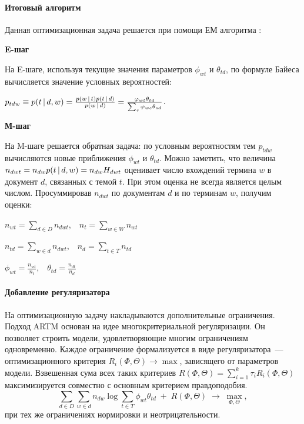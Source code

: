 \documentclass[12pt, twoside]{article}
\begin{document}
\paragraph{Итоговый алгоритм}

Данная оптимизационная задача решается при помощи ЕМ алгоритма \cite{hofmann1999probabilistic}:

\noindent\textbf{E-шаг}

На E-шаге, используя текущие значения параметров $\phi_{wt}$ и $\theta_{td}$, по формуле Байеса вычисляется значение условных вероятностей:

$p_{tdw} \equiv p(t \mspace{3mu}{|}\mspace{3mu} d,w) = \frac {p(w \mspace{3mu}{|}\mspace{3mu} t)p(t \mspace{3mu}{|}\mspace{3mu} d)} {p(w \mspace{3mu}{|}\mspace{3mu} d)} = \frac {\varphi_{wt}\theta_{td}} {\sum_s\varphi_{ws}\theta_{sd}}$.

\noindent\textbf{М-шаг}

На M-шаге решается обратная задача: по условным вероятностям тем $p_{tdw}$ вычисляются новые приближения $\phi_{wt}$ и $\theta_{td}$.
Можно заметить, что величина $n_{dwt}=n_{dw}p(t \mspace{3mu}{|}\mspace{3mu} d,w)=n_{dw}H_{dwt}$ оценивает число вхождений термина $w$ в документ $d$, связанных с темой $t$. При этом оценка не всегда является целым числом. Просуммировав $n_{dwt}$ по документам $d$ и по терминам $w$, получим оценки:

$n_{wt}=\sum_{d \in D} n_{dwt}$,~~$n_t = \sum_{w \in W}n_{wt}$

$n_{td}=\sum_{w \in d} n_{dwt}$,~~$n_d = \sum_{t \in T}n_{td}$

$\phi_{wt}=\frac{n_{wt}}{n_t}$,~~$\theta_{td} = \frac{n_{dt}}{n_{d}}$


\paragraph{Добавление регуляризатора}
На оптимизационную задачу накладываются дополнительные ограничения. Подход ARTM \cite{vorontsov2014additive,vorontsov2014tutorial,vorontsov2015additive} основан на идее многокритериальной регуляризации. Он позволяет строить модели, удовлетворяющие многим ограничениям одновременно. Каждое ограничение формализуется в виде регуляризатора~--- оптимизационного критерия $R_i(\Phi,\Theta)\to\max$, зависящего от параметров модели. Взвешенная сума всех таких критериев $R(\Phi,\Theta) = \sum_{i=1}^k \tau_i R_i(\Phi,\Theta)$ максимизируется совместно с основным критерием правдоподобия.
\[
\sum_{d\in D} \sum_{w\in d} n_{dw}\log \sum_{t\in T} \phi_{wt}\theta_{td} \;+\; R(\Phi,\Theta)\;\to\; \max_{\Phi,\Theta},
\]
при тех же ограничениях нормировки и неотрицательности.
\end{document}
